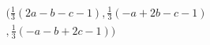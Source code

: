\begin{multline*}
 (  \frac{1}{3}(2a-b-c-1), \frac{1}{3}(-a+2b-c-1) \\, 
\frac{1}{3}(-a-b+2c-1) ) 
\end{multline*}
